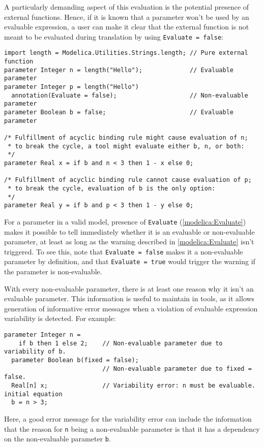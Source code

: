 \begin{example}
A particularly demanding aspect of this evaluation is the potential presence of external functions.
Hence, if it is known that a parameter won't be used by an evaluable expression, a user can make it clear that the external function is not meant to be evaluated during translation by using \lstinline!Evaluate = false!:
\begin{lstlisting}[language=modelica]
import length = Modelica.Utilities.Strings.length; // Pure external function
parameter Integer n = length("Hello");             // Evaluable parameter
parameter Integer p = length("Hello")
  annotation(Evaluate = false);                    // Non-evaluable parameter
parameter Boolean b = false;                       // Evaluable parameter

/* Fulfillment of acyclic binding rule might cause evaluation of n;
 * to break the cycle, a tool might evaluate either b, n, or both:
 */
parameter Real x = if b and n < 3 then 1 - x else 0;

/* Fulfillment of acyclic binding rule cannot cause evaluation of p;
 * to break the cycle, evaluation of b is the only option:
 */
parameter Real y = if b and p < 3 then 1 - y else 0;
\end{lstlisting}
\end{example}

\begin{nonnormative}
For a parameter in a valid model, presence of \lstinline!Evaluate! (\cref{modelica:Evaluate}) makes it possible to tell immediately whether it is an evaluable or non-evaluable parameter, at least as long as the warning described in \cref{modelica:Evaluate} isn't triggered.
To see this, note that \lstinline!Evaluate = false! makes it a non-evaluable parameter by definition, and that \lstinline!Evaluate = true! would trigger the warning if the parameter is non-evaluable.
\end{nonnormative}

\begin{nonnormative}
With every non-evaluable parameter, there is at least one reason why it isn't an evaluable parameter.
This information is useful to maintain in tools, as it allows generation of informative error messages when a violation of evaluable expression variability is detected.
For example:
\begin{lstlisting}[language=modelica]
  parameter Integer n =
    if b then 1 else 2;    // Non-evaluable parameter due to variability of b.
  parameter Boolean b(fixed = false);
                           // Non-evaluable parameter due to fixed = false.
  Real[n] x;               // Variability error: n must be evaluable.
initial equation
  b = n > 3;
\end{lstlisting}
Here, a good error message for the variability error can include the information that the reason for \lstinline!n! being a non-evaluable parameter is that it has a dependency on the non-evaluable parameter \lstinline!b!.
\end{nonnormative}

